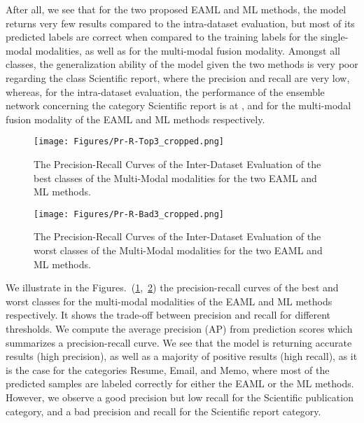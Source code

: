 \documentclass[twocolumn]{svjour3}
\begin{document}
After all, we see that for the two proposed EAML and ML methods, the model returns very few results compared to the intra-dataset evaluation, but most of its predicted labels are correct when compared to the training labels for the single-modal modalities, as well as for the multi-modal fusion modality.
Amongst all classes, the generalization ability of the model given the two methods is very poor regarding the class Scientific report, where the precision and recall are very low, whereas, for the intra-dataset evaluation, the performance of the ensemble network concerning the category Scientific report is at , and  for the multi-modal fusion modality of the EAML and ML methods respectively.
\begin{figure}[ht]
\centering
  \texttt{[image: Figures/Pr-R-Top3\_cropped.png]}
  \caption{The Precision-Recall Curves of the Inter-Dataset Evaluation of the best classes of the Multi-Modal modalities for the two EAML and ML methods.}
    \label{fig:Precision_Recall_EVAL_BEST_EAML/ML}
\end{figure}

\begin{figure}[ht]
\centering
  \texttt{[image: Figures/Pr-R-Bad3\_cropped.png]}
  \caption{The Precision-Recall Curves of the Inter-Dataset Evaluation of the worst classes of the Multi-Modal modalities for the two EAML and ML methods.}
   \label{fig:Precision_Recall_EVAL_WORST_EAML/ML}
\end{figure}
We illustrate in the Figures.~(\ref{fig:Precision_Recall_EVAL_BEST_EAML/ML},~\ref{fig:Precision_Recall_EVAL_WORST_EAML/ML}) the precision-recall curves of the best and worst classes for the multi-modal modalities of the EAML and ML methods respectively. It shows the trade-off between precision and recall for different thresholds. We compute the average precision (AP) from prediction scores which summarizes a precision-recall curve. We see that the model is returning accurate results (high precision), as well as a majority of positive results (high recall), as it is the case for the categories Resume, Email, and Memo, where most of the predicted samples are labeled correctly for either the EAML or the ML methods. However, we observe a good precision but low recall for the Scientific publication category, and a bad precision and recall for the Scientific report category.
\end{document}
